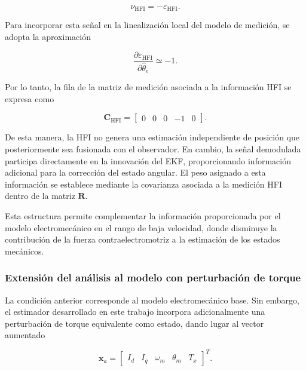 \begin{equation}
\nu_{\mathrm{HFI}}
=
-\varepsilon_{\mathrm{HFI}}.
\end{equation}

Para incorporar esta señal en la linealización local del modelo de medición, se adopta la aproximación

\begin{equation}
\frac{\partial \varepsilon_{\mathrm{HFI}}}
{\partial \hat{\theta}_e}
\simeq -1.
\label{eq:jacobiano_hfi}
\end{equation}

Por lo tanto, la fila de la matriz de medición asociada a la información HFI se expresa como

\begin{equation}
\mathbf{C}_{\mathrm{HFI}}
=
\begin{bmatrix}
0 & 0 & 0 & -1 & 0
\end{bmatrix}.
\label{eq:C_hfi}
\end{equation}

De esta manera, la HFI no genera una estimación independiente de posición que posteriormente sea fusionada con el observador. En cambio, la señal demodulada participa directamente en la innovación del EKF, proporcionando información adicional para la corrección del estado angular. El peso asignado a esta información se establece mediante la covarianza asociada a la medición HFI dentro de la matriz $\mathbf{R}$.

Esta estructura permite complementar la información proporcionada por el modelo electromecánico en el rango de baja velocidad, donde disminuye la contribución de la fuerza contraelectromotriz a la estimación de los estados mecánicos.


\subsubsection{Extensión del análisis al modelo con perturbación de torque}

La condición anterior corresponde al modelo electromecánico base. Sin embargo,
el estimador desarrollado en este trabajo incorpora adicionalmente una
perturbación de torque equivalente como estado, dando lugar al vector aumentado

\begin{equation}
    \mathbf{x}_a
    =
    \begin{bmatrix}
        I_d &
        I_q &
        \omega_m &
        \theta_m &
        T_x
    \end{bmatrix}^{T}.
    \label{eq:vector_estado_aumentado_observabilidad}
\end{equation}

